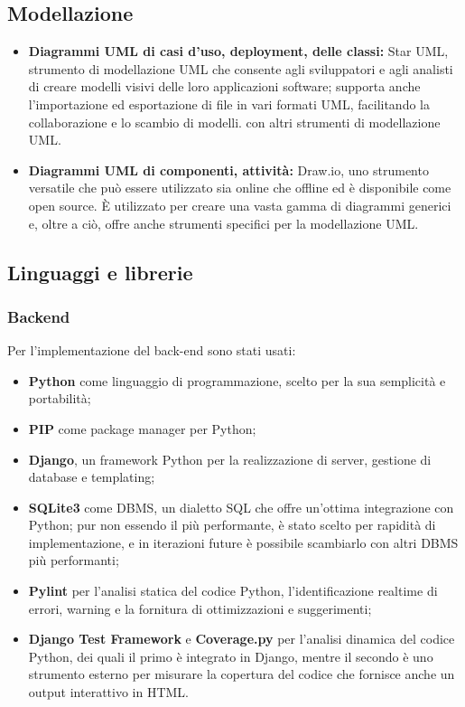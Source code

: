 \subsection{Modellazione}
\begin{itemize}
      \item \textbf{Diagrammi UML di casi d'uso, deployment, delle classi:} Star UML,  strumento di modellazione UML che 
      consente agli sviluppatori e agli analisti di creare modelli visivi delle loro applicazioni software; supporta anche 
      l'importazione ed esportazione di file in vari formati UML, facilitando la collaborazione e lo scambio di modelli.
      con altri strumenti di modellazione UML.
      \item \textbf{Diagrammi UML di componenti, attività:}  Draw.io, uno strumento versatile che può essere utilizzato 
      sia online che offline ed è disponibile come open source. È utilizzato per creare una vasta gamma di diagrammi generici e,
      oltre a ciò, offre anche strumenti specifici per la modellazione UML.
\end{itemize}

\vspace{5pt}
\subsection{Linguaggi e librerie}

\subsubsection{Backend} Per l'implementazione del back-end sono stati usati:
\begin{itemize}
    \item \textbf{Python} come linguaggio di programmazione, scelto per la sua semplicità
    e portabilità;
    \item \textbf{PIP} come package manager per Python;
    \item \textbf{Django}, un framework Python per la realizzazione di server, gestione
    di database e templating;
    \item \textbf{SQLite3} come DBMS, un dialetto SQL che offre un'ottima integrazione
    con Python; pur non essendo il più performante, è stato scelto per
    rapidità di implementazione, e in iterazioni future è possibile scambiarlo
    con altri DBMS più performanti;
    \item \textbf{Pylint} per l'analisi statica del codice Python, l'identificazione realtime
    di errori, warning e la fornitura di ottimizzazioni e suggerimenti;
    \item \textbf{Django Test Framework} e \textbf{Coverage.py} per l'analisi dinamica del
    codice Python, dei quali il primo è integrato in Django, mentre il secondo
    è uno strumento esterno per misurare la copertura del codice che
    fornisce anche un output interattivo in HTML.
\end{itemize}

